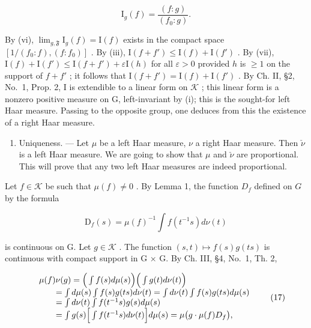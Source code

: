 \[
\mathrm{I} _ {g} (f) = \frac {(f : g)}{(f _ {0} : g)}.
\]

By (vi), \(\lim_{g,\mathfrak{F}}\mathrm{I}_g(f) = \mathrm{I}(f)\) exists in the compact space \([1 / (f_0:f),(f:f_0)]\) . By (iii), \(\mathrm{I}(f + f')\leqslant \mathrm{I}(f) + \mathrm{I}(f')\) . By (vii), \(\mathrm{I}(f) + \mathrm{I}(f')\leqslant \mathrm{I}(f + f') + \varepsilon \mathrm{I}(h)\) for all \(\varepsilon >0\) provided \(h\) is \(\geqslant 1\) on the support of \(f + f'\) ; it follows that \(\mathrm{I}(f + f') = \mathrm{I}(f) + \mathrm{I}(f')\) . By Ch. II, §2, No.~1, Prop. 2, I is extendible to a linear form on \(\mathcal{K}\) ; this linear form is a nonzero positive measure on G, left-invariant by (i); this is the sought-for left Haar measure. Passing to the opposite group, one deduces from this the existence of a right Haar measure.

\begin{enumerate}
\def\labelenumi{\Alph{enumi})}
\setcounter{enumi}{1}
\tightlist
\item
  Uniqueness. --- Let \(\mu\) be a left Haar measure, \(\nu\) a right Haar measure. Then \(\check{\nu}\) is a left Haar measure. We are going to show that \(\mu\) and \(\check{\nu}\) are proportional. This will prove that any two left Haar measures are indeed proportional.
\end{enumerate}

Let \(f \in \mathcal{K}\) be such that \(\mu(f) \neq 0\) . By Lemma 1, the function \(D_f\) defined on \(G\) by the formula

\[
\mathrm{D} _ {f} (s) = \mu (f) ^ {- 1} \int f (t ^ {- 1} s) d \nu (t)\tag{16}
\]

is continuous on G. Let \(g \in \mathcal{K}\) . The function \((s, t) \mapsto f(s)g(ts)\) is continuous with compact support in G × G. By Ch. III, §4, No.~1, Th. 2,

\[
\begin{array}{r l} & {\mu (f) \nu (g) = \Big (\int f (s) d \mu (s) \Big) \Big (\int g (t) d \nu (t) \Big)} \\ & {\qquad = \int d \mu (s) \int f (s) g (t s) d \nu (t) = \int d \nu (t) \int f (s) g (t s) d \mu (s)} \\ & {\qquad = \int d \nu (t) \int f (t ^ {- 1} s) g (s) d \mu (s)} \\ & {\qquad = \int g (s) \Big [ \int f (t ^ {- 1} s) d \nu (t) \Big ] d \mu (s) = \mu \big (g \cdot \mu (f) D _ {f} \big),} \end{array}\tag{17}
\]

